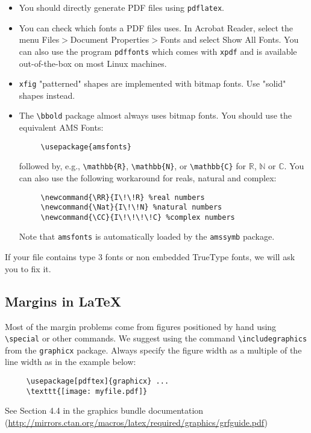   
  \begin{itemize}
  
  
  \item You should directly generate PDF files using \verb+pdflatex+.
  
  
  \item You can check which fonts a PDF files uses.  In Acrobat Reader, select the
    menu Files$>$Document Properties$>$Fonts and select Show All Fonts. You can
    also use the program \verb+pdffonts+ which comes with \verb+xpdf+ and is
    available out-of-the-box on most Linux machines.
  
  
  \item \verb+xfig+ "patterned" shapes are implemented with bitmap fonts.  Use
    "solid" shapes instead.
  
  
  \item The \verb+\bbold+ package almost always uses bitmap fonts.  You should use
    the equivalent AMS Fonts:
  \begin{verbatim}
     \usepackage{amsfonts}
  \end{verbatim}
  followed by, e.g., \verb+\mathbb{R}+, \verb+\mathbb{N}+, or \verb+\mathbb{C}+
  for $\mathbb{R}$, $\mathbb{N}$ or $\mathbb{C}$.  You can also use the following
  workaround for reals, natural and complex:
  \begin{verbatim}
     \newcommand{\RR}{I\!\!R} %real numbers
     \newcommand{\Nat}{I\!\!N} %natural numbers
     \newcommand{\CC}{I\!\!\!\!C} %complex numbers
  \end{verbatim}
  Note that \verb+amsfonts+ is automatically loaded by the \verb+amssymb+ package.
  
  
  \end{itemize}
  
  
  If your file contains type 3 fonts or non embedded TrueType fonts, we will ask
  you to fix it.
  
  
  \subsection{Margins in \LaTeX{}}
  
  
  Most of the margin problems come from figures positioned by hand using
  \verb+\special+ or other commands. We suggest using the command
  \verb+\includegraphics+ from the \verb+graphicx+ package. Always specify the
  figure width as a multiple of the line width as in the example below:
  \begin{verbatim}
     \usepackage[pdftex]{graphicx} ...
     \texttt{[image: myfile.pdf]}
  \end{verbatim}
  See Section 4.4 in the graphics bundle documentation
  (\url{http://mirrors.ctan.org/macros/latex/required/graphics/grfguide.pdf})
  
